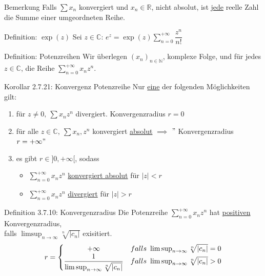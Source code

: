 \documentclass[a4paper,10pt]{article}
\begin{document}
\begin{bembox}
    {Bemerkung}
    Falls $\sum x_n$ konvergiert und $x_n\in\mathbb R$, nicht absolut, ist \underline{jede} reelle Zahl die Summe einer umgeordneten Reihe.
\end{bembox}
\begin{defbox}
    {Definition: $\exp(z)$}
    Sei $z\in\mathbb C$: $e^z=\exp(z)\sum_{n=0}^{+\infty}\dfrac{z^n}{n!}$
\end{defbox}
\begin{defbox}
    {Definition: Potenzreihen}
    Wir überlegen $(x_n)_{n\in\mathbb N}$, komplexe Folge, und für jedes $z\in \mathbb C$, die Reihe $\sum_{n=0}^{+\infty}x_nz^n$.
\end{defbox}
\begin{tbox}
    {Korollar 2.7.21: Konvergenz Potenzreihe}
    Nur \underline{eine} der folgenden Möglichkeiten gilt:
    \begin{enumerate}
        \item für $z\neq 0,\ \sum x_nz^n$ divergiert. Konvergenzradius $r=0$
        \item für alle $z\in\mathbb C,\ \sum x_n,z^n$ konvergiert \underline{absolut} $\implies$ $"$ Konvergenzradius $r=+\infty"$
        \item es gibt $r\in ]0,+\infty[$, sodass
        \begin{itemize}
            \item $\sum_{n=0}^{+\infty}x_nz^n$ \underline{konvergiert absolut} für $|z|<r$
            \item $\sum_{n=0}^{+\infty}x_nz^n$ \underline{divergiert} für $|z|>r$
        \end{itemize}
    \end{enumerate}
\end{tbox}
\begin{defbox}
    {Definition 3.7.10: Konvergenzradius}
    Die Potenzreihe $\sum_{n=0}^{+\infty}x_nz^n$ hat \underline{positiven} Konvergenzradius,\\
    falls $\limsup_{n\to\infty}\sqrt[n]{|c_n|}$ exisitiert.    
    $$r=
    \begin{cases}
    
        \hfil +\infty & falls \ \limsup_{n\to\infty}\sqrt[n]{|c_n|}=0
        \\ \dfrac{1}{\limsup_{n\to\infty}\sqrt[n]{|c_n|}} & falls \ \limsup_{n\to\infty}\sqrt[n]{|c_n|}>0
    \end{cases}$$

    
\end{defbox}
\end{document}
